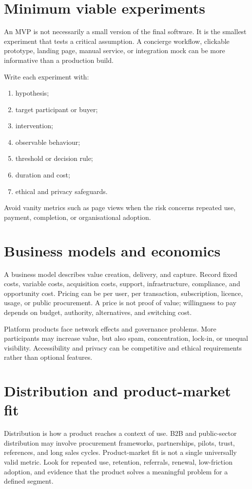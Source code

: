 \section{Minimum viable experiments}
An MVP is not necessarily a small version of the final software. It is the smallest experiment that tests a critical assumption. A concierge workflow, clickable prototype, landing page, manual service, or integration mock can be more informative than a production build.

Write each experiment with:
\begin{enumerate}
\item hypothesis;
\item target participant or buyer;
\item intervention;
\item observable behaviour;
\item threshold or decision rule;
\item duration and cost;
\item ethical and privacy safeguards.
\end{enumerate}
Avoid vanity metrics such as page views when the risk concerns repeated use, payment, completion, or organisational adoption.

\section{Business models and economics}
A business model describes value creation, delivery, and capture. Record fixed costs, variable costs, acquisition costs, support, infrastructure, compliance, and opportunity cost. Pricing can be per user, per transaction, subscription, licence, usage, or public procurement. A price is not proof of value; willingness to pay depends on budget, authority, alternatives, and switching cost.

Platform products face network effects and governance problems. More participants may increase value, but also spam, concentration, lock-in, or unequal visibility. Accessibility and privacy can be competitive and ethical requirements rather than optional features.

\section{Distribution and product-market fit}
Distribution is how a product reaches a context of use. B2B and public-sector distribution may involve procurement frameworks, partnerships, pilots, trust, references, and long sales cycles. Product-market fit is not a single universally valid metric. Look for repeated use, retention, referrals, renewal, low-friction adoption, and evidence that the product solves a meaningful problem for a defined segment.

